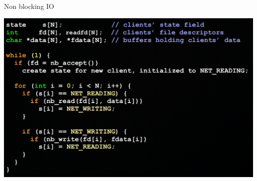 \begin{frame}{Non blocking IO}
  \begin{center}
    \includegraphics[width=\textwidth,keepaspectratio]{sources/images/noblocking_io.png}
  \end{center}
\end{frame}